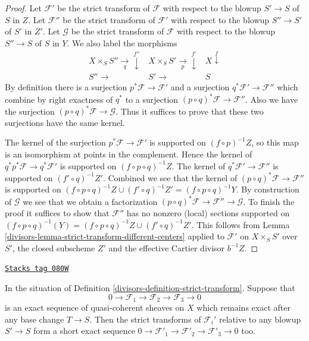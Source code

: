 \begin{proof}

Let $\mathcal{F}'$ be the strict transform of $\mathcal{F}$ with respect
to the blowup $S' \to S$ of $S$ in $Z$.
Let $\mathcal{F}''$ be the strict transform of $\mathcal{F}'$ with respect
to the blowup $S'' \to S'$ of $S'$ in $Z'$.
Let $\mathcal{G}$ be the strict transform of $\mathcal{F}$ with respect
to the blowup $S'' \to S$ of $S$ in $Y$.
We also label the morphisms
$$
\begin{array}{ccc}X \times_S S'' \underset{q}{\longrightarrow}\overset{f''}{\downarrow} & X \times_S S' \underset{p}{\longrightarrow}\overset{f'}{\downarrow} & X \overset{f}{\downarrow} \\ S'' \longrightarrow & S' \longrightarrow & S\end{array}
$$
By definition there is a surjection $p^*\mathcal{F} \to \mathcal{F}'$
and a surjection $q^*\mathcal{F}' \to \mathcal{F}''$ which combine
by right exactness of $q^*$ to a surjection
$(p \circ q)^*\mathcal{F} \to \mathcal{F}''$. Also we have the surjection
$(p \circ q)^*\mathcal{F} \to \mathcal{G}$. Thus it suffices to prove
that these two surjections have the same kernel.

\medskip\noindent
The kernel of the surjection $p^*\mathcal{F} \to \mathcal{F}'$
is supported on $(f \circ p)^{-1}Z$, so this map is an isomorphism at
points in the complement. Hence the kernel of
$q^*p^*\mathcal{F} \to q^*\mathcal{F}'$
is supported on $(f \circ p \circ q)^{-1}Z$. The kernel of
$q^*\mathcal{F}' \to \mathcal{F}''$ is supported on $(f' \circ q)^{-1}Z'$.
Combined we see that the kernel of
$(p \circ q)^*\mathcal{F} \to \mathcal{F}''$ is supported on
$(f \circ p \circ q)^{-1}Z \cup (f' \circ q)^{-1}Z' =
(f \circ p \circ q)^{-1}Y$.
By construction of $\mathcal{G}$ we see that we obtain a factorization
$(p \circ q)^*\mathcal{F} \to \mathcal{F}'' \to \mathcal{G}$.
To finish the proof it suffices to show that $\mathcal{F}''$ has no
nonzero (local) sections supported on
$(f \circ p \circ q)^{-1}(Y) =
(f \circ p \circ q)^{-1}Z \cup (f' \circ q)^{-1}Z'$.
This follows from Lemma \ref{divisors-lemma-strict-transform-different-centers}
applied to $\mathcal{F}'$ on $X \times_S S'$ over $S'$, the closed
subscheme $Z'$ and the effective Cartier divisor $b^{-1}Z$.
\end{proof}

\begin{lemma}
\label{divisors-lemma-strict-transform-universally-injective}
\href{https://stacks.math.columbia.edu/tag/080W}{\texttt{Stacks tag 080W}}

In the situation of Definition \ref{divisors-definition-strict-transform}.
Suppose that
$$
0 \to \mathcal{F}_1 \to \mathcal{F}_2 \to \mathcal{F}_3 \to 0
$$
is an exact sequence of quasi-coherent sheaves on $X$ which remains
exact after any base change $T \to S$. Then the strict transforms of
$\mathcal{F}_i'$ relative to any blowup $S' \to S$
form a short exact sequence
$0 \to \mathcal{F}'_1 \to \mathcal{F}'_2 \to \mathcal{F}'_3 \to 0$ too.
\end{lemma}

